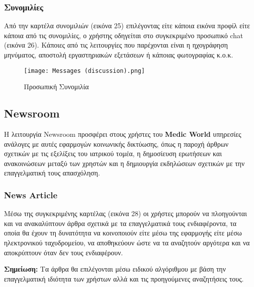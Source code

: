 \documentclass{article}
\begin{document}
\subsubsection{Συνομιλίες}

Από την καρτέλα συνομιλιών (εικόνα 25) επιλέγοντας είτε κάποια εικόνα προφίλ είτε κάποια από τις συνομιλίες, ο χρήστης οδηγείται στο συγκεκριμένο προσωπικό chat (εικόνα 26). Κάποιες από τις λειτουργίες που παρέχονται είναι η ηχογράφηση μηνύματος, αποστολή εργαστηριακών εξετάσεων ή κάποιας φωτογραφίας κ.ο.κ.

\vspace{0.3cm}

\begin{figure}[!htb]
\centering
\texttt{[image: Messages (discussion).png]} 
\caption{\label{fig: discussion} Προσωπική Συνομιλία}
\end{figure}

\subsection{Newsroom}

Η λειτουργία Newsroom προσφέρει στους χρήστες του \textbf{Medic World} υπηρεσίες ανάλογες με αυτές εφαρμογών κοινωνικής δικτύωσης, όπως η παροχή άρθρων σχετικών με τις εξελίξεις του ιατρικού τομέα, η δημοσίευση ερωτήσεων και ανακοινώσεων μεταξύ των χρηστών και η δημιουργία εκδηλώσεων σχετικών με την επαγγελματική τους απασχόληση.

\newpage

\subsubsection{News Article}

Μέσω της συγκεκριμένης καρτέλας (εικόνα 28) οι χρήστες μπορούν να πλοηγούνται και να ανακαλύπτουν άρθρα σχετικά με τα επαγγελματικά τους ενδιαφέροντα, τα οποία θα έχουν τη δυνατότητα να κοινοποιούν είτε μέσω της εφαρμογής είτε μέσω ηλεκτρονικού ταχυδρομείου, να αποθηκεύουν ώστε να τα αναζητούν αργότερα και να αποκρύπτουν όταν δεν τους ενδιαφέρουν.

\vspace{0.3cm}

\textbf{Σημείωση:} Τα άρθρα θα επιλέγονται μέσω ειδικού αλγόριθμου με βάση την επαγγελματική ιδιότητα των χρήστων αλλά και τις προηγούμενες αναζητήσεις τους.

\vspace{0.3cm}
\end{document}
